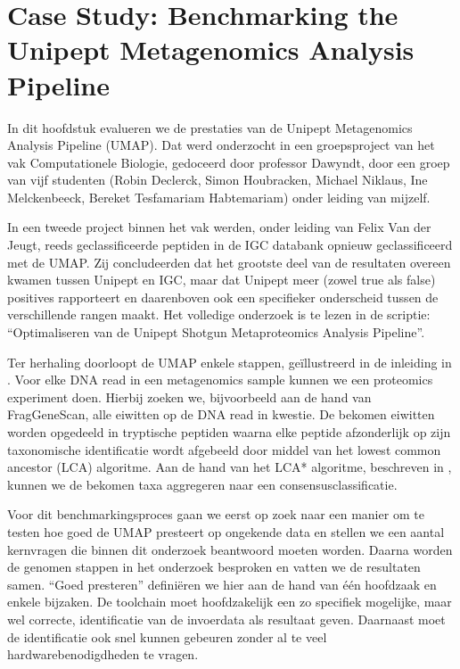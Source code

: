 \chapter{Case Study: Benchmarking the Unipept Metagenomics Analysis Pipeline}
\label{chap:casestudy}

In dit hoofdstuk evalueren we de prestaties van de Unipept Metagenomics Analysis
Pipeline (UMAP). Dat werd onderzocht in een groepsproject van het vak
Computationele Biologie, gedoceerd door professor Dawyndt, door een groep van
vijf studenten (Robin Declerck, Simon Houbracken, Michael Niklaus, Ine
Melckenbeeck, Bereket Tesfamariam Habtemariam) onder leiding van mijzelf.

In een tweede project binnen het vak werden, onder leiding van Felix Van der
Jeugt, reeds geclassificeerde peptiden in de IGC databank opnieuw
geclassificeerd met de UMAP. Zij concludeerden dat het grootste deel van de
resultaten overeen kwamen tussen Unipept en IGC, maar dat Unipept meer (zowel
true als false) positives rapporteert en daarenboven ook een specifieker
onderscheid tussen de verschillende rangen maakt. Het volledige onderzoek is te
lezen in de scriptie: ``Optimaliseren van de Unipept Shotgun
Metaproteomics Analysis Pipeline''\cite{felixthesis}.

Ter herhaling doorloopt de UMAP enkele stappen, geïllustreerd in de inleiding in
. Voor elke DNA read in een metagenomics sample kunnen we een
proteomics experiment doen. Hierbij zoeken we, bijvoorbeeld aan de hand van
FragGeneScan, alle eiwitten op de DNA read in kwestie. De bekomen eiwitten
worden opgedeeld in tryptische peptiden waarna elke peptide afzonderlijk op zijn
taxonomische identificatie wordt afgebeeld door middel van het lowest common
ancestor (LCA) algoritme. Aan de hand van het LCA* algoritme, beschreven in
, kunnen we de bekomen taxa aggregeren naar een
consensusclassificatie.

Voor dit benchmarkingsproces gaan we eerst op zoek naar een manier om te testen
hoe goed de UMAP presteert op ongekende data en stellen we een aantal kernvragen
die binnen dit onderzoek beantwoord moeten worden. Daarna worden de genomen
stappen in het onderzoek besproken en vatten we de resultaten samen. ``Goed
presteren'' definiëren we hier aan de hand van één hoofdzaak en enkele bijzaken.
De toolchain moet hoofdzakelijk een zo specifiek mogelijke, maar wel correcte,
identificatie van de invoerdata als resultaat geven. Daarnaast moet de
identificatie ook snel kunnen gebeuren zonder al te veel hardwarebenodigdheden
te vragen.

